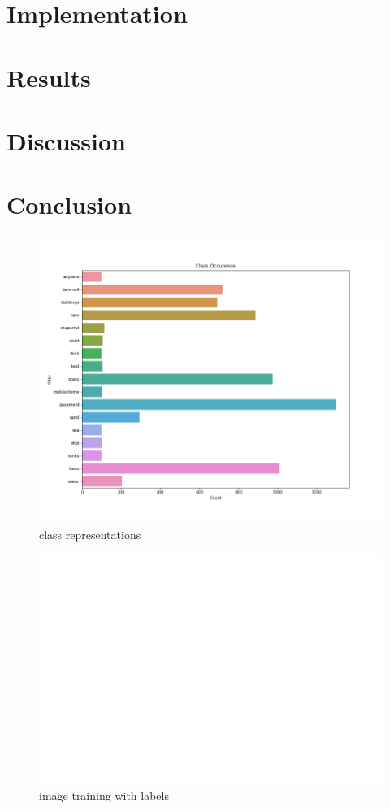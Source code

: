 \documentclass{article}
\begin{document}
\section{Implementation}

\section{Results}
\section{Discussion}
\section{Conclusion}
\begin{figure}
    \centering
    \includegraphics[width=1\textwidth]{classes.png}
    \caption{class representations}
    \label{fig:classes}
\end{figure}

\begin{figure}
    \centering
    \includegraphics[width=1\textwidth]{train_picture_w_labels.png}
    \caption{image training with labels}
    \label{fig:trainpicture}
\end{figure}





\end{document}
